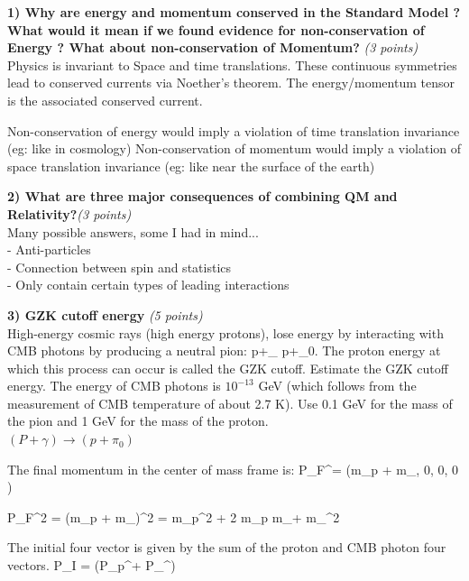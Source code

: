 {\large


\textbf{1) Why are energy and momentum conserved in the Standard Model ?  What would it mean if we found evidence for non-conservation of Energy ? What about non-conservation of Momentum? }\hfill \textit{(3 points)}\\

Physics is invariant to Space and time translations. 
These continuous symmetries lead to conserved currents via Noether's theorem.
The energy/momentum tensor is the associated conserved current. 

Non-conservation of energy would imply a violation of time translation invariance (eg: like in cosmology) 
Non-conservation of momentum would imply a violation of space translation invariance (eg: like near the surface of the earth)  

\vspace*{0.3in}

\textbf{2) What are three major consequences of combining QM and Relativity?}\hfill \textit{(3 points)}\\

Many possible answers, some I had in mind...\\
- Anti-particles\\
- Connection between spin and statistics\\
- Only contain certain types of leading interactions

\vspace*{0.3in}

\textbf{3)  GZK cutoff energy} \hfill \textit{(5 points)}\\
High-energy cosmic rays (high energy protons), lose energy by interacting with CMB photons by producing a neutral pion:
\be
p+\gamma_{} \rightarrow p+\pi_0.
\ee
The proton energy at which this process can occur is called the GZK cutoff. 
Estimate the GZK cutoff energy.
The energy of CMB photons is $10^{-13}$ GeV (which follows from the measurement of CMB temperature of about 2.7 K).
Use 0.1 GeV for the mass of the pion and 1 GeV for the mass of the proton.\\

$(P+\gamma) \rightarrow (p + \pi_0)$

The final momentum in the center of mass frame is:
\be
P_{F}^\mu = (m_p + m_\pi, 0, 0, 0 )
\ee

\be
P_{F}^2 = (m_p + m_\pi)^2 = m_p^2 + 2 m_p  m_\pi + m_\pi^2
\ee

The initial four vector is given by the sum of the proton and CMB photon four vectors.
\be
P_{I} = (P_p^\mu + P_\gamma^\mu)
\ee

}
